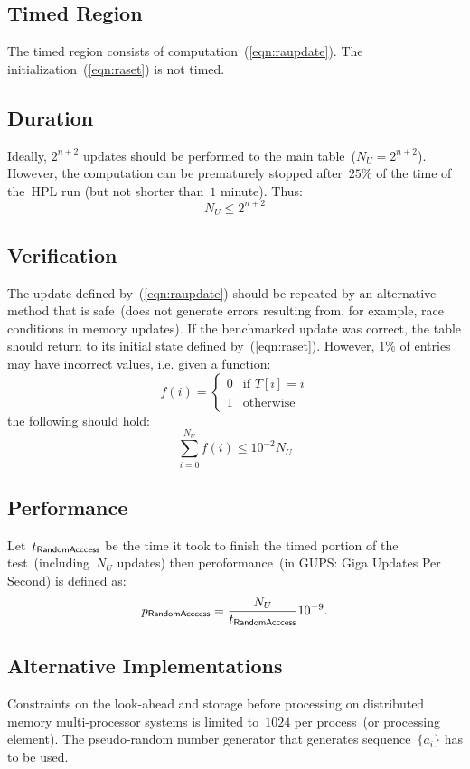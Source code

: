 \documentclass[twocolumn]{article}
\newcommand{\HPL}{\textsf{HPL}\xspace}
\newcommand{\randa}{\textsf{\scriptsize RandomAcccess}\xspace}
\begin{document}
\subsection{Timed Region}
The timed region consists of computation~(\ref{eqn:raupdate}).
The initialization~(\ref{eqn:raset}) is not timed.

\subsection{Duration}
Ideally, $2^{n+2}$ updates should be performed to the main
table~($N_U=2^{n+2}$). However, the computation can be prematurely stopped
after~$25\%$ of the time of the~\HPL run (but not shorter than~$1$ minute). Thus:
\begin{equation}
  N_U \le 2^{n+2}
\end{equation}

\subsection{Verification}
The update defined by~(\ref{eqn:raupdate}) should be repeated by an
alternative method that is safe~(does not generate errors resulting from, for
example, race conditions in memory updates). If the benchmarked update was
correct, the table should return to its initial state defined
by~(\ref{eqn:raset}). However, $1\%$ of entries may have incorrect values,
i.e. given a function:
\begin{equation}
  f(i) = \left\{\begin{array}{ll}0 & \textrm{if } T[i]=i \\ 1 & \textrm{otherwise} \end{array}\right.
\end{equation}
the following should hold:
\begin{equation}
  \sum_{i=0}^{N_U}f(i) \le 10^{-2}N_U
\end{equation}

\subsection{Performance}
Let~$t_{\randa}$ be the time it took to finish the timed portion of the
test~(including~$N_U$ updates) then peroformance~(in GUPS: Giga Updates Per
Second) is defined as:
\begin{equation}
  p_{\randa} = \frac{N_U}{t_{\randa}} 10^{-9}.
\end{equation}

\subsection{Alternative Implementations}
Constraints on the look-ahead and storage before processing on distributed
memory multi-processor systems is limited to~$1024$ per process~(or
processing element). The pseudo-random number generator that generates
sequence~$\{a_i\}$ has to be used.
\end{document}
